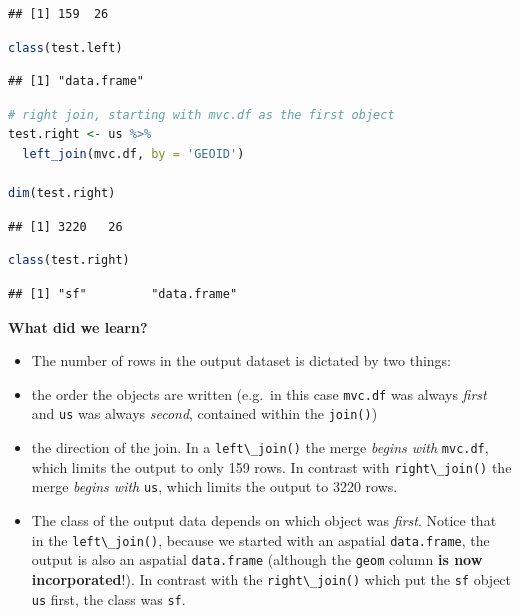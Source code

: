 \documentclass[
]{book}
\newcommand{\passthrough}[1]{#1}
\providecommand{\tightlist}{%
  \setlength{\itemsep}{0pt}\setlength{\parskip}{0pt}}
\begin{document}
\begin{lstlisting}
## [1] 159  26
\end{lstlisting}

\begin{lstlisting}[language=R]
class(test.left)
\end{lstlisting}

\begin{lstlisting}
## [1] "data.frame"
\end{lstlisting}

\begin{lstlisting}[language=R]
# right join, starting with mvc.df as the first object
test.right <- us %>%
  left_join(mvc.df, by = 'GEOID')

dim(test.right)
\end{lstlisting}

\begin{lstlisting}
## [1] 3220   26
\end{lstlisting}

\begin{lstlisting}[language=R]
class(test.right)
\end{lstlisting}

\begin{lstlisting}
## [1] "sf"         "data.frame"
\end{lstlisting}

\textbf{What did we learn?}

\begin{itemize}
\tightlist
\item
  The number of rows in the output dataset is dictated by two things:
\item
  the order the objects are written (e.g.~in this case \passthrough{\lstinline!mvc.df!} was always \emph{first} and \passthrough{\lstinline!us!} was always \emph{second}, contained within the \passthrough{\lstinline!join()!})
\item
  the direction of the join. In a \passthrough{\lstinline!left\_join()!} the merge \emph{begins with} \passthrough{\lstinline!mvc.df!}, which limits the output to only 159 rows. In contrast with \passthrough{\lstinline!right\_join()!} the merge \emph{begins with} \passthrough{\lstinline!us!}, which limits the output to 3220 rows.
\item
  The class of the output data depends on which object was \emph{first}. Notice that in the \passthrough{\lstinline!left\_join()!}, because we started with an aspatial \passthrough{\lstinline!data.frame!}, the output is also an aspatial \passthrough{\lstinline!data.frame!} (although the \passthrough{\lstinline!geom!} column \textbf{is now incorporated}!). In contrast with the \passthrough{\lstinline!right\_join()!} which put the \passthrough{\lstinline!sf!} object \passthrough{\lstinline!us!} first, the class was \passthrough{\lstinline!sf!}.
\end{itemize}
\end{document}
